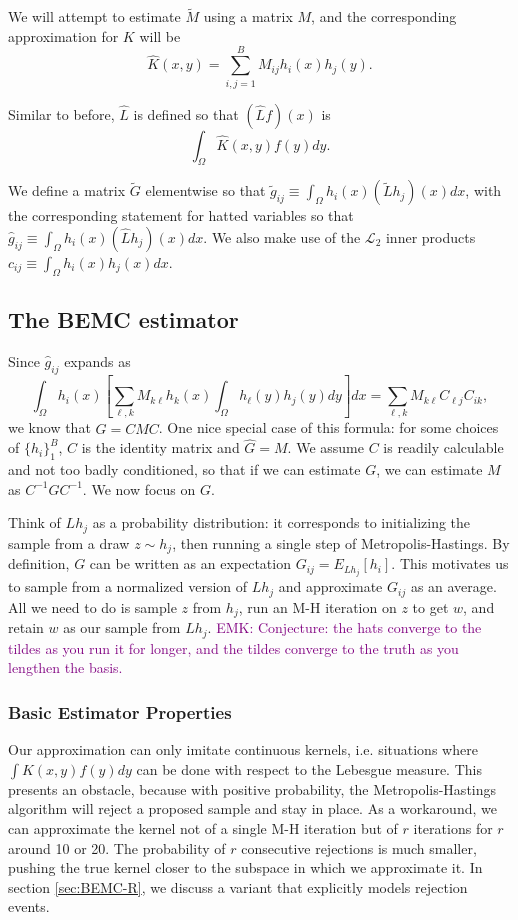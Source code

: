 \documentclass{article}
\newcommand\EMK[1]{\textcolor{purple}{EMK: #1}}
\begin{document}
We will attempt to estimate $\tilde{M}$ using a matrix $M$, and the corresponding approximation for $K$ will be 
\begin{equation}
\label{eqn:khatdef}
\hat{K}(x,y) = \sum_{i,j=1}^B M_{ij} h_i(x)h_j(y).\end{equation}

Similar to before, $\hat{L}$ is defined so that $(\hat{L}f)(x)$ is $$\int_{\Omega}\hat{K}(x,y)f(y)dy.$$


We define a matrix $\tilde{G}$ elementwise so that $\tilde{g}_{ij}\equiv \int_{\Omega} h_i(x)(\tilde{L}h_j)(x)dx$, with the corresponding statement for hatted variables so that $\hat{g}_{ij}\equiv \int_{\Omega} h_i(x)(\hat{L}h_j)(x)dx$. We also make use of the $\mathcal{L}_2$ inner products $c_{ij}\equiv \int_{\Omega} h_i(x)h_j(x)dx$.

\subsection{The BEMC estimator}

Since $\hat{g}_{ij}$ expands as $$ \int_{\Omega} h_i(x)\left[\sum_{\ell,k} M_{k\ell}h_k(x)\int_{\Omega} h_\ell(y)h_j(y)dy\right]dx= \sum_{\ell,k} M_{k\ell}C_{\ell j}C_{ik},$$ we know that $\hat{G}=CMC$. One nice special case of this formula: for some choices of $\{h_i\}_1^B$, $C$ is the identity matrix and $\hat{G}=M$. We assume $C$ is readily calculable and not too badly conditioned, so that if we can estimate $G$, we can estimate $M$ as $C^{-1}GC^{-1}$. We now focus on $G$. 

Think of $Lh_j$ as a probability distribution: it corresponds to initializing the sample from a draw $z\sim h_j$, then running a single step of Metropolis-Hastings. By definition, $G$ can be written as an expectation $G_{ij} = E_{Lh_j}[h_i]$. This motivates us to sample from a normalized version of $Lh_j$ and approximate $G_{ij}$ as an average. All we need to do is sample $z$ from $h_j$, run an M-H iteration on $z$ to get $w$, and retain $w$ as our sample from $Lh_j$. \EMK{Conjecture: the hats converge to the tildes as you run it for longer, and the tildes converge to the truth as you lengthen the basis.}

\subsubsection{Basic Estimator Properties}
Our approximation can only imitate continuous kernels, i.e. situations where $\int K(x,y)f(y)dy$ can be done with respect to the Lebesgue measure. This presents an obstacle, because with positive probability, the Metropolis-Hastings algorithm will reject a proposed sample and stay in place. As a workaround, we can approximate the kernel not of a single M-H iteration but of $r$ iterations for $r$ around 10 or 20. The probability of $r$ consecutive rejections is much smaller, pushing the true kernel closer to the subspace in which we approximate it. In section \ref{sec:BEMC-R}, we discuss a variant that explicitly models rejection events.
\end{document}

